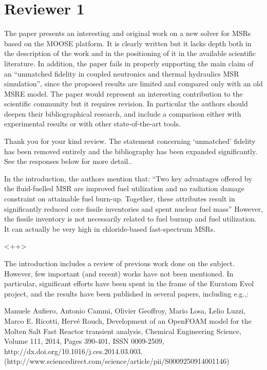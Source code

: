 \documentclass[answers,11pt]{exam}
\begin{document}
\section*{Reviewer 1}
\begin{questions}

\question The paper presents an interesting and original work on a new solver
for MSRs based on the MOOSE platform.  It is clearly written but it lacks depth
both in the description of the work and in the positioning of it in the
available scientific literature.  In addition, the paper fails in properly
supporting the main claim of an ``unmatched fidelity in coupled neutronics and
thermal hydraulics MSR simulation'', since the proposed results are limited and
compared only with an old MSRE model. The paper would represent an interesting
contribution to the scientific community but it requires revision. In
particular the authors should deepen their bibliographical research, and
include a comparison either with experimental results or with other
state-of-the-art tools.
\begin{solution}
        Thank you for your kind review.
        The statement concerning `unmatched' fidelity has been removed
        entirely and the bibliography has been expanded significantly. See the
        responses below for more detail..
\end{solution}


\question In the introduction, the authors mention that:
``Two key advantages offered by the fluid-fuelled MSR are improved fuel
        utilization and no radiation damage constraint on attainable fuel
        burn-up. Together, these attributes result in significantly reduced
        core fissile inventories and spent nuclear fuel mass''
However, the fissile inventory is not necessarily related to fuel burnup and fuel utilization. It can actually be  very high in chloride-based fast-spectrum MSRs.
\begin{solution}
        <++>
\end{solution}

\question The introduction includes a review of previous work done on the
subject. However, few important (and recent) works have not been mentioned. In
particular, significant efforts have been spent in the frame of the Euratom Evol
project, and the results have been published in several papers, including e.g.,:

Manuele Aufiero, Antonio Cammi, Olivier Geoffroy, Mario Losa, Lelio Luzzi, Marco
E. Ricotti, Hervé Rouch, Development of an OpenFOAM model for the Molten Salt
Fast Reactor transient analysis, Chemical Engineering Science, Volume 111, 2014,
Pages 390-401, ISSN 0009-2509, http://dx.doi.org/10.1016/j.ces.2014.03.003.
(http://www.sciencedirect.com/science/article/pii/S0009250914001146)


\end{questions}
\end{document}
